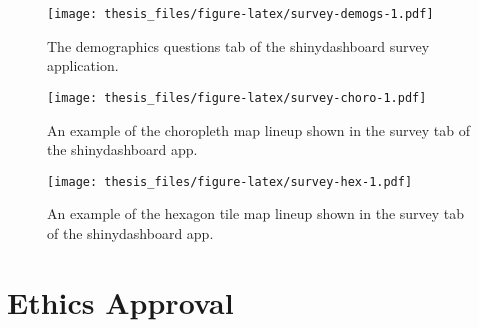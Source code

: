 \documentclass{monashthesis}
\begin{document}
\begin{figure}
\centering
\texttt{[image: thesis\_files/figure-latex/survey-demogs-1.pdf]}
\caption{\label{fig:survey-demogs}The demographics questions tab of the shinydashboard survey application.}
\end{figure}

\begin{figure}
\centering
\texttt{[image: thesis\_files/figure-latex/survey-choro-1.pdf]}
\caption{\label{fig:survey-choro}An example of the choropleth map lineup shown in the survey tab of the shinydashboard app.}
\end{figure}

\begin{figure}
\centering
\texttt{[image: thesis\_files/figure-latex/survey-hex-1.pdf]}
\caption{\label{fig:survey-hex}An example of the hexagon tile map lineup shown in the survey tab of the shinydashboard app.}
\end{figure}

\hypertarget{ch:ethics}{%
\chapter{Ethics Approval}\label{ch:ethics}}



\printbibliography[heading=bibintoc]
\end{document}
